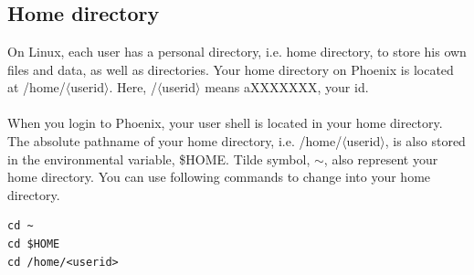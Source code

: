 
\chapter{\moduleTitle}
\newpage

\section{Home directory}
On Linux, each user has a personal directory, i.e. home directory, to store his own files and data, as well as directories. 
Your home directory on Phoenix is located at /home/$\langle$userid$\rangle$. Here, /$\langle$userid$\rangle$ means aXXXXXXX, your id.\\  \\
When you login to Phoenix, your user shell is located in your home directory. The absolute pathname of your home directory, i.e. /home/$\langle$userid$\rangle$, is also stored in the environmental variable, \$HOME. Tilde symbol, $\mathtt{\sim}$, also represent your home directory. You can use following commands to change into your home directory.
\begin{steps}
\begin{lstlisting}
cd ~
cd $HOME
cd /home/<userid>
\end{lstlisting}
\end{steps}

